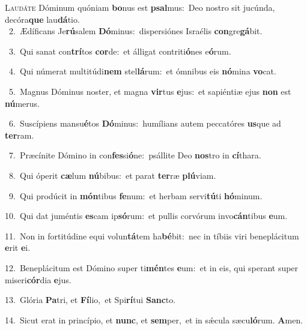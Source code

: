 \lettrine{\initial\textcolor{\initialcolor}{L}}{audáte} Dóminum quóniam \textbf{bo}\-nus est \textbf{psal}\-mus:~\star Deo nostro sit jucúnda, decóra\textbf{que} lau\-\textbf{dá}\-tio.\\
{\numbfont\textcolor{\numbcolor}{~2.}}~Ædíficans Je\-\textbf{rú}\-salem \textbf{Dó}\-minus:~\star dispersiónes Israélis \textbf{con}\-gre\-\textbf{gá}\-bit.\par
{\numbfont\textcolor{\numbcolor}{~3.}}~Qui sanat con\-\textbf{trí}\-tos \textbf{cor}\-de:~\star et álligat contriti\-\textbf{ó}\-nes e\-\textbf{ó}\-rum.\par
{\numbfont\textcolor{\numbcolor}{~4.}}~Qui númerat multitúdi\textbf{nem} stel\-\textbf{lá}\-rum:~\star et ómnibus eis \textbf{nó}\-mina \textbf{vo}\-cat.\par
{\numbfont\textcolor{\numbcolor}{~5.}}~Magnus Dóminus noster, et magna \textbf{vir}\-tus \textbf{e}\-jus:~\star et sapiéntiæ ejus \textbf{non} est \textbf{nú}\-merus.\par
{\numbfont\textcolor{\numbcolor}{~6.}}~Suscípiens mansu\-\textbf{é}\-tos \textbf{Dó}\-minus:~\star humílians autem peccatóres \textbf{us}\-que ad \textbf{ter}\-ram.\par
{\numbfont\textcolor{\numbcolor}{~7.}}~Præcínite Dómino in con\-\textbf{fes}\-si\-\textbf{ó}\-ne:~\star psállite Deo \textbf{nos}\-tro in \textbf{cí}\-thara.\par
{\numbfont\textcolor{\numbcolor}{~8.}}~Qui óperit \textbf{cæ}\-lum \textbf{nú}\-bibus:~\star et parat \textbf{ter}\-ræ \textbf{plú}\-viam.\par
{\numbfont\textcolor{\numbcolor}{~9.}}~Qui prodúcit in \textbf{món}\-tibus \textbf{fe}\-num:~\star et herbam servi\-\textbf{tú}\-ti \textbf{hó}\-minum.\par
{\numbfont\textcolor{\numbcolor}{10.}}~Qui dat juméntis \textbf{es}\-cam ip\-\textbf{só}\-rum:~\star et pullis corvórum invo\-\textbf{cán}\-tibus \textbf{e}\-um.\par
{\numbfont\textcolor{\numbcolor}{11.}}~Non in fortitúdine equi volun\-\textbf{tá}\-tem ha\-\textbf{bé}\-bit:~\star nec in tíbiis viri beneplácitum \textbf{e}\-rit \textbf{e}\-i.\par
{\numbfont\textcolor{\numbcolor}{12.}}~Beneplácitum est Dómino super ti\-\textbf{mén}\-tes \textbf{e}\-um:~\star et in eis, qui sperant super miseri\-\textbf{cór}\-dia \textbf{e}\-jus.\par
{\numbfont\textcolor{\numbcolor}{13.}}~Glória \textbf{Pa}\-tri, et \textbf{Fí}\-lio,~\star et Spi\-\textbf{rí}\-tui \textbf{Sanc}\-to.\par
{\numbfont\textcolor{\numbcolor}{14.}}~Sicut erat in princípio, et \textbf{nunc}\-, et \textbf{sem}\-per,~\star et in sǽcula sæcu\-\textbf{ló}\-rum. \textbf{A}\-men.\par
